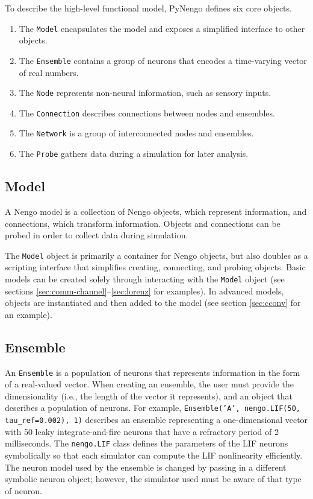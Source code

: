 \documentclass{frontiersSCNS}
\begin{document}
To describe the high-level functional model,
PyNengo defines six core objects.
\begin{enumerate}
  \item The \texttt{Model} encapsulates the model and
    exposes a simplified interface to other objects.
  \item The \texttt{Ensemble} contains a group of neurons
    that encodes a time-varying vector of real numbers.
  \item The \texttt{Node} represents non-neural information,
    such as sensory inputs.
  \item The \texttt{Connection} describes connections
    between nodes and ensembles.
  \item The \texttt{Network} is a group of interconnected
    nodes and ensembles.
  \item The \texttt{Probe} gathers data during a simulation
    for later analysis.
\end{enumerate}

\subsection{Model}

A Nengo model is a collection
of Nengo objects, which represent information,
and connections, which transform information.
Objects and connections can be probed
in order to collect data during simulation.

The \texttt{Model} object is primarily a container
for Nengo objects,
but also doubles as a scripting interface
that simplifies creating, connecting,
and probing objects.
Basic models
can be created solely through interacting
with the \texttt{Model} object
(see sections \ref{sec:comm-channel}--\ref{sec:lorenz}
for examples).
In advanced models,
objects are instantiated
and then added to the model
(see section \ref{sec:cconv} for an example).

\subsection{Ensemble}

An \texttt{Ensemble} is
a population of neurons
that represents information
in the form of a real-valued vector.
When creating an ensemble,
the user must provide the dimensionality
(i.e., the length of the vector it represents),
and an object that describes
a population of neurons.
For example, \texttt{Ensemble('A', nengo.LIF(50, tau\_ref=0.002), 1)}
describes an ensemble representing a one-dimensional vector
with 50 leaky integrate-and-fire neurons \cite{TODO} %
that have a refractory period of 2 milliseconds.
The \texttt{nengo.LIF} class defines
the parameters of the LIF neurons symbolically
so that each simulator can compute
the LIF nonlinearity efficiently.
The neuron model used by the ensemble
is changed by passing in a different symbolic neuron object;
however, the simulator used must be aware
of that type of neuron.
\end{document}
